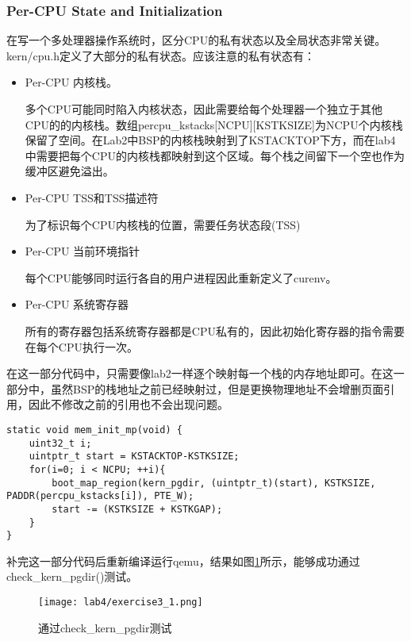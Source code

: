 \subsubsection{Per-CPU State and Initialization}
\par 在写一个多处理器操作系统时，区分CPU的私有状态以及全局状态非常关键。kern/cpu.h定义了大部分的私有状态。应该注意的私有状态有：
\begin{itemize}
    \item Per-CPU 内核栈。
        \par 多个CPU可能同时陷入内核状态，因此需要给每个处理器一个独立于其他CPU的的内核栈。数组percpu\_kstacks[NCPU][KSTKSIZE]为NCPU个内核栈保留了空间。在Lab2中BSP的内核栈映射到了KSTACKTOP下方，而在lab4中需要把每个CPU的内核栈都映射到这个区域。每个栈之间留下一个空也作为缓冲区避免溢出。
    \item Per-CPU TSS和TSS描述符
        \par 为了标识每个CPU内核栈的位置，需要任务状态段(TSS)
    \item Per-CPU 当前环境指针
        \par 每个CPU能够同时运行各自的用户进程因此重新定义了curenv。
    \item Per-CPU 系统寄存器
        \par 所有的寄存器包括系统寄存器都是CPU私有的，因此初始化寄存器的指令需要在每个CPU执行一次。
\end{itemize}
\begin{exerciseSolution}{3}
    \par 在这一部分代码中，只需要像lab2一样逐个映射每一个栈的内存地址即可。在这一部分中，虽然BSP的栈地址之前已经映射过，但是更换物理地址不会增删页面引用，因此不修改之前的引用也不会出现问题。
    \begin{lstlisting}
static void mem_init_mp(void) {
    uint32_t i;
    uintptr_t start = KSTACKTOP-KSTKSIZE;
    for(i=0; i < NCPU; ++i){
        boot_map_region(kern_pgdir, (uintptr_t)(start), KSTKSIZE, PADDR(percpu_kstacks[i]), PTE_W);
        start -= (KSTKSIZE + KSTKGAP);
    }
}
    \end{lstlisting}
    \par 补完这一部分代码后重新编译运行qemu，结果如图\ref{fig:lab4/exercise3_1}所示，能够成功通过check\_kern\_pgdir()测试。
    \begin{figure}[htb]
        \centering
        \texttt{[image: lab4/exercise3\_1.png]}
        \caption{通过check\_kern\_pgdir测试}
        \label{fig:lab4/exercise3_1}
    \end{figure}
    \FloatBarrier
\end{exerciseSolution}

